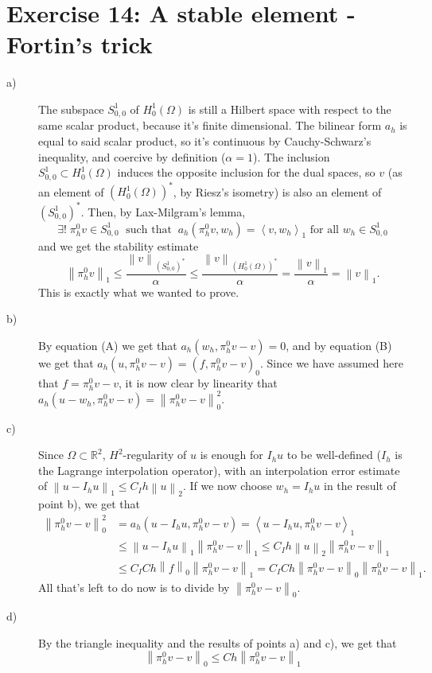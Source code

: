 \documentclass[a4paper]{article}
\newcommand{\norm}[1]{\left\lVert #1 \right\rVert}
\newcommand{\dpair}[1]{\left\langle #1 \right\rangle}
\newcommand{\R}{\mathbb{R}}
\begin{document}
\section*{Exercise 14: A stable element - Fortin's trick}
\begin{description}
\item[a)] The subspace $S_{0,0}^1$ of $H_0^1(\Omega)$ is still a Hilbert space
	with respect to the same scalar product, because it's finite dimensional.
	The bilinear form $a_h$ is equal to said scalar product, so it's continuous
	by Cauchy-Schwarz's inequality, and coercive by definition ($\alpha = 1$).
	The inclusion $S_{0,0}^1 \subset H_0^1(\Omega)$ induces the opposite
	inclusion for the dual spaces, so $v$ (as an element of $(H_0^1(\Omega))^*$,
	by Riesz's isometry) is also an element of $(S_{0,0}^1)^*$.
	Then, by Lax-Milgram's lemma,
	\[
	\exists! \; \pi_h^0v \in S_{0,0}^1 \; \text{ such that} \;\;
	a_h(\pi_h^0v, w_h) = \dpair{v, w_h}_1 \text{ for all } w_h \in S_{0,0}^1
	\]
	and we get the stability estimate
	\[
	\norm{\pi_h^0v}_1
	\leq \frac{\norm{v}_{(S_{0,0}^1)^*}}{\alpha}
	\leq \frac{\norm{v}_{(H_0^1(\Omega))^*}}{\alpha}
	= \frac{\norm{v}_1}{\alpha}
	= \norm{v}_1.
	\]
	This is exactly what we wanted to prove.
\item[b)] By equation (A) we get that $a_h(w_h,\pi^0_hv-v)=0$,
	and by equation (B) we get that $a_h(u,\pi^0_hv-v)=(f,\pi^0_hv-v)_0$.
	Since we have assumed here that $f=\pi^0_hv-v$,
	it is now clear by linearity that $a_h(u-w_h,\pi^0_hv-v)=\norm{\pi_h^0v-v}_0^2$.
\item[c)] Since $\Omega \subset \R^2$, $H^2$-regularity of $u$ is enough
	for $I_h u$ to be well-defined ($I_h$ is the Lagrange interpolation operator),
	with an interpolation error estimate of $\norm{u-I_h u}_1 \leq C_I h \norm{u}_2$.
	If we now choose $w_h = I_h u$ in the result of point b), we get that
	\begin{align*}
	\norm{\pi_h^0v-v}_0^2
&	= a_h(u-I_h u,\pi_h^0v-v)
	= \dpair{u-I_h u,\pi_h^0v-v}_1 \\
&	\leq \norm{u-I_h u}_1 \norm{\pi_h^0v-v}_1
	\leq C_I h \norm{u}_2 \norm{\pi_h^0v-v}_1 \\
&	\leq C_I C h \norm{f}_0 \norm{\pi_h^0v-v}_1
	= C_I C h \norm{\pi_h^0v-v}_0 \norm{\pi_h^0v-v}_1.
	\end{align*}
	All that's left to do now is to divide by $\norm{\pi_h^0v-v}_0$.
\item[d)] By the triangle inequality and the results of points a) and c),
	we get that
	\[
	\norm{\pi_h^0v-v}_0
	\leq C h \norm{\pi_h^0v-v}_1
\]
\end{description}
\end{document}
